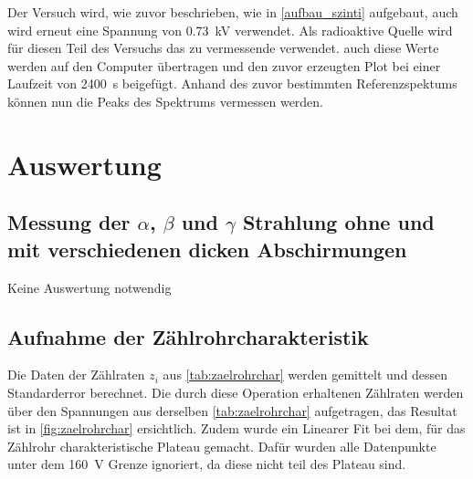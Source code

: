 \documentclass[12pt,english,ngerman]{scrartcl}
\begin{document}
Der Versuch wird, wie zuvor beschrieben, wie in \autoref{aufbau_szinti}
aufgebaut, auch wird erneut eine Spannung von \SI{0.73}{\kilo\volt} verwendet.
Als radioaktive Quelle wird für diesen Teil des Versuchs das zu vermessende
 verwendet. auch diese Werte werden auf den Computer
übertragen und den zuvor erzeugten Plot bei einer Laufzeit von
\SI{2400}{\second} beigefügt. Anhand des zuvor bestimmten Referenzspektums
können nun die Peaks des  Spektrums vermessen werden.


\section{Auswertung}\label{sec:Auswertung}

\subsection{Messung der \texorpdfstring{$\alpha$}{alpha}, \texorpdfstring{$\beta$}{beta} und
\texorpdfstring{$\gamma$}{gamma} Strahlung ohne und mit verschiedenen dicken Abschirmungen}

Keine Auswertung notwendig


\subsection{Aufnahme der Zählrohrcharakteristik}

Die Daten der Zählraten $z_i$ aus \autoref{tab:zaelrohrchar} werden gemittelt und
dessen Standarderror berechnet. Die durch diese Operation erhaltenen Zählraten
werden über den Spannungen aus derselben \autoref{tab:zaelrohrchar}
aufgetragen, das Resultat ist in \autoref{fig:zaelrohrchar} ersichtlich. Zudem
wurde ein Linearer Fit bei dem, für das Zählrohr charakteristische Plateau gemacht.
Dafür wurden alle Datenpunkte unter dem \SI{160}{\volt} Grenze ignoriert, da diese
nicht teil des Plateau sind.
\end{document}
